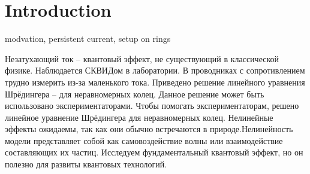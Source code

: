 \documentclass[A4,12pt,oneside]{article}
\renewcommand{\(}{\left(}
\renewcommand{\)}{\right)}
\newcommand{\nprog}{\color{green!50!black}}
\begin{document}
\section{Introduction}

{\nprog modvation, persistent current, setup on rings

Незатухающий ток – квантовый эффект, не существующий в классической физике. Наблюдается СКВИДом в лаборатории. В проводниках с сопротивлением трудно измерить из-за маленького тока. Приведено решение линейного уравнения Шрёдингера -- для неравномерных колец. Данное решение может быть использовано экспериментаторами. Чтобы помогать экспериментаторам, решено линейное уравнение Шрёдингера для неравномерных колец.
Нелинейные эффекты ожидаемы, так как они обычно встречаются в природе.Нелинейность модели представляет собой как самовоздействие волны или взаимодействие составляющих их частиц. Исследуем фундаментальный квантовый эффект, но он полезно для развиты квантовых технологий.}
\end{document}
